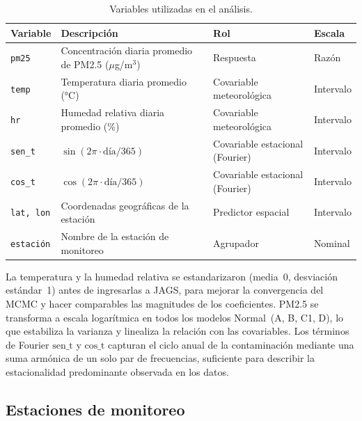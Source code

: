 \documentclass[12pt]{article}
\begin{document}
\begin{table}[H]
\centering
\caption{Variables utilizadas en el an\'alisis.}
\label{tab:variables}
\small
\begin{tabular}{>{\raggedright\arraybackslash}p{2.3cm}
                >{\raggedright\arraybackslash}p{6cm}
                >{\raggedright\arraybackslash}p{3.8cm}
                >{\raggedright\arraybackslash}p{2cm}}
\toprule
Variable & Descripci\'on & Rol & Escala \\
\midrule
\texttt{pm25}    & Concentraci\'on diaria promedio de PM2.5 ($\mu$g/m$^3$)
                 & Respuesta & Raz\'on \\
\texttt{temp}    & Temperatura diaria promedio (°C)
                 & Covariable meteorol\'ogica & Intervalo \\
\texttt{hr}      & Humedad relativa diaria promedio (\%)
                 & Covariable meteorol\'ogica & Intervalo \\
\texttt{sen\_t}  & $\sin(2\pi\cdot\text{d\'ia}/365)$
                 & Covariable estacional (Fourier) & Intervalo \\
\texttt{cos\_t}  & $\cos(2\pi\cdot\text{d\'ia}/365)$
                 & Covariable estacional (Fourier) & Intervalo \\
\texttt{lat, lon}& Coordenadas geogr\'aficas de la estaci\'on
                 & Predictor espacial & Intervalo \\
\texttt{estaci\'on}& Nombre de la estaci\'on de monitoreo
                 & Agrupador & Nominal \\
\bottomrule
\end{tabular}
\normalsize
\end{table}

La temperatura y la humedad relativa se estandarizaron
(media~0, desviaci\'on est\'andar~1) antes de ingresarlas a JAGS,
para mejorar la convergencia del MCMC y hacer comparables las magnitudes
de los coeficientes.
PM2.5 se transforma a escala logar\'itmica en todos los modelos
Normal~(A, B, C1, D), lo que estabiliza la varianza y linealiza la
relaci\'on con las covariables.
Los t\'erminos de Fourier $\text{sen\_t}$ y $\text{cos\_t}$ capturan el ciclo anual de la
contaminaci\'on mediante una suma armónica de un solo par de frecuencias,
suficiente para describir la estacionalidad predominante observada en los datos.

\subsection*{Estaciones de monitoreo}
\end{document}
